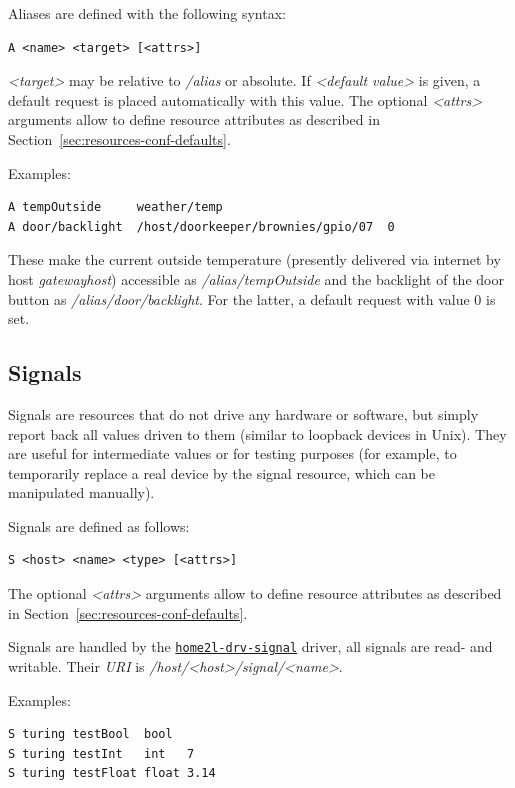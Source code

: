 \documentclass[12pt,english,parskip=half,headheight=19pt]{scrreprt}
\newcommand{\idx}[1]{#1\index{#1}}
\newcommand{\reftool}[1]{\hyperref[tool:#1]{\texttt{\idx{#1}}}}
\begin{document}
Aliases are defined with the following syntax:
\begin{lstlisting}
A <name> <target> [<attrs>]
\end{lstlisting}

\textit{<target>} may be relative to \textit{/alias} or absolute. If \textit{<default value>} is given, a default request is placed automatically with this value. The optional \textit{<attrs>} arguments allow to define resource attributes as described in Section~\ref{sec:resources-conf-defaults}.

Examples:
\begin{lstlisting}
A tempOutside     weather/temp
A door/backlight  /host/doorkeeper/brownies/gpio/07  0
\end{lstlisting}

These make the current outside temperature (presently delivered via internet by host \textit{gatewayhost}) accessible as \textit{/alias/tempOutside} and the backlight of the door button as \textit{/alias/door/backlight}. For the latter, a default request with value 0 is set.


\subsection{Signals}
\label{sec:resources-conf-signals}

Signals are resources that do not drive any hardware or software, but simply report back all values driven to them (similar to loopback devices in Unix). They are useful for intermediate values or for testing purposes (for example, to temporarily replace a real device by the signal resource, which can be manipulated manually).

Signals are defined as follows:
\begin{lstlisting}
S <host> <name> <type> [<attrs>]
\end{lstlisting}

The optional \textit{<attrs>} arguments allow to define resource attributes as described in Section~\ref{sec:resources-conf-defaults}.

Signals are handled by the \reftool{home2l-drv-signal} driver, all signals are read- and writable. Their \textit{URI} is \textit{/host/<host>/signal/<name>}.

Examples:
\begin{lstlisting}
S turing testBool  bool
S turing testInt   int   7
S turing testFloat float 3.14
\end{lstlisting}
\end{document}
